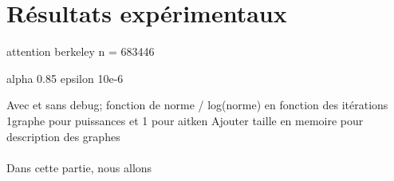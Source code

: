 \section{Résultats expérimentaux}

	attention berkeley n = 683446
	
	alpha 0.85 epsilon 10e-6
	
	Avec et sans debug; fonction de norme / log(norme) en fonction des itérations
	1graphe pour puissances et 1 pour aitken
	Ajouter taille en memoire pour description des graphes
	
	\paragraph{}Dans cette partie, nous allons
